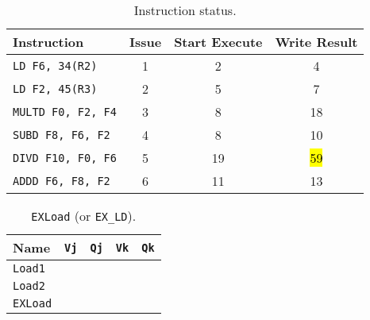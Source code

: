 \begin{enumerate}
    \begin{table}[!htp]
        \centering
        \begin{tabular}{@{} l | c c c @{}}
            \toprule
            Instruction                 & Issue & Start Execute & Write Result  \\
            \midrule
            \texttt{LD    F6, 34(R2)}   & 1     & 2             & 4             \\ [.3em]
            \texttt{LD    F2, 45(R3)}   & 2     & 5             & 7             \\ [.3em]
            \texttt{MULTD F0, F2, F4}   & 3     & 8             & 18            \\ [.3em]
            \texttt{SUBD  F8, F6, F2}   & 4     & 8             & 10            \\ [.3em]
            \texttt{DIVD  F10, F0, F6}  & 5     & 19            & \hl{59}       \\ [.3em]
            \texttt{ADDD  F6, F8, F2}   & 6     & 11            & 13            \\
            \bottomrule
        \end{tabular}
        \caption*{Instruction status.}
    \end{table}

    \begin{table}[!htp]
        \centering
        \begin{tabular}{@{} l | c c c c @{}}
            \toprule
            Name            & \texttt{Vj}   & \texttt{Qj}   & \texttt{Vk}           & \texttt{Qk}   \\
            \midrule
            \texttt{Load1}  &               &               &                       &               \\ [.3em]
            \texttt{Load2}  &               &               &                       &               \\
            \cmidrule{1-5}
            \texttt{EXLoad} &               &               &                       &               \\
            \bottomrule
        \end{tabular}
        \caption*{\texttt{EXLoad} (or \texttt{EX\_LD}).}
    \end{table}


\end{enumerate}
